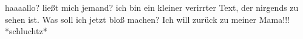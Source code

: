 


















haaaallo? ließt mich jemand?
ich bin ein kleiner verirrter Text, der nirgends zu sehen ist.
Was soll ich jetzt bloß machen? Ich will zurück zu meiner Mama!!! *schluchtz*
